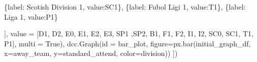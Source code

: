 \documentclass[
  letterpaper,
  DIV=11,
  numbers=noendperiod]{scrartcl}
\newenvironment{Shaded}{\begin{snugshade}}{\end{snugshade}}
\newcommand{\BuiltInTok}[1]{\textcolor[rgb]{0.00,0.23,0.31}{#1}}
\newcommand{\NormalTok}[1]{\textcolor[rgb]{0.00,0.23,0.31}{#1}}
\newcommand{\OperatorTok}[1]{\textcolor[rgb]{0.37,0.37,0.37}{#1}}
\newcommand{\StringTok}[1]{\textcolor[rgb]{0.13,0.47,0.30}{#1}}
\newcommand{\VariableTok}[1]{\textcolor[rgb]{0.07,0.07,0.07}{#1}}
\begin{document}
\begin{Shaded}
\begin{Highlighting}[]
\NormalTok{                \{}\StringTok{\textquotesingle{}label\textquotesingle{}}\NormalTok{: }\StringTok{\textquotesingle{}Scotish Division 1\textquotesingle{}}\NormalTok{, }\StringTok{\textquotesingle{}value\textquotesingle{}}\NormalTok{:}\StringTok{\textquotesingle{}SC1\textquotesingle{}}\NormalTok{\},}
\NormalTok{                \{}\StringTok{\textquotesingle{}label\textquotesingle{}}\NormalTok{: }\StringTok{\textquotesingle{}Fubol Ligi 1\textquotesingle{}}\NormalTok{, }\StringTok{\textquotesingle{}value\textquotesingle{}}\NormalTok{:}\StringTok{\textquotesingle{}T1\textquotesingle{}}\NormalTok{\},}
\NormalTok{                \{}\StringTok{\textquotesingle{}label\textquotesingle{}}\NormalTok{: }\StringTok{\textquotesingle{}Liga 1\textquotesingle{}}\NormalTok{, }\StringTok{\textquotesingle{}value\textquotesingle{}}\NormalTok{:}\StringTok{\textquotesingle{}P1\textquotesingle{}}\NormalTok{\}}


\NormalTok{                 ], value }\OperatorTok{=}\NormalTok{ [}\StringTok{\textquotesingle{}D1\textquotesingle{}}\NormalTok{, }\StringTok{\textquotesingle{}D2\textquotesingle{}}\NormalTok{, }\StringTok{\textquotesingle{}E0\textquotesingle{}}\NormalTok{, }\StringTok{\textquotesingle{}E1\textquotesingle{}}\NormalTok{, }\StringTok{\textquotesingle{}E2\textquotesingle{}}\NormalTok{, }\StringTok{\textquotesingle{}E3\textquotesingle{}}\NormalTok{, }\StringTok{\textquotesingle{}SP1\textquotesingle{}}\NormalTok{ ,}\StringTok{\textquotesingle{}SP2\textquotesingle{}}\NormalTok{, }\StringTok{\textquotesingle{}B1\textquotesingle{}}\NormalTok{, }\StringTok{\textquotesingle{}F1\textquotesingle{}}\NormalTok{, }\StringTok{\textquotesingle{}F2\textquotesingle{}}\NormalTok{, }\StringTok{\textquotesingle{}I1\textquotesingle{}}\NormalTok{, }\StringTok{\textquotesingle{}I2\textquotesingle{}}\NormalTok{, }\StringTok{\textquotesingle{}SC0\textquotesingle{}}\NormalTok{, }\StringTok{\textquotesingle{}SC1\textquotesingle{}}\NormalTok{, }\StringTok{\textquotesingle{}T1\textquotesingle{}}\NormalTok{, }\StringTok{\textquotesingle{}P1\textquotesingle{}}\NormalTok{],}
\NormalTok{                 multi }\OperatorTok{=} \VariableTok{True}\NormalTok{),}
\NormalTok{    dcc.Graph(}\BuiltInTok{id} \OperatorTok{=} \StringTok{\textquotesingle{}bar\_plot\textquotesingle{}}\NormalTok{, figure}\OperatorTok{=}\NormalTok{px.bar(initial\_graph\_df, x}\OperatorTok{=}\StringTok{\textquotesingle{}away\_team\textquotesingle{}}\NormalTok{, y}\OperatorTok{=}\StringTok{\textquotesingle{}standard\_attend\textquotesingle{}}\NormalTok{, color}\OperatorTok{=}\StringTok{\textquotesingle{}division\textquotesingle{}}\NormalTok{))}
\NormalTok{])}


\end{Highlighting}
\end{Shaded}
\end{document}
